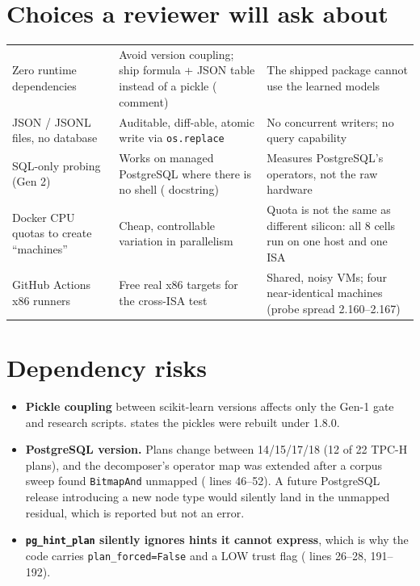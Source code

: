\section{Choices a reviewer will ask about}
\begin{center}\small
\begin{tabularx}{\textwidth}{@{}L{3.4cm}YY@{}}
\toprule {} &  & \\ \midrule
Zero runtime dependencies & Avoid version coupling; ship formula + JSON table instead of a pickle ( comment) & The shipped package cannot use the learned models\\
JSON / JSONL files, no database & Auditable, diff-able, atomic write via \texttt{os.replace} & No concurrent writers; no query capability\\
SQL-only probing (Gen 2) & Works on managed PostgreSQL where there is no shell ( docstring) & Measures PostgreSQL's operators, not the raw hardware\\
Docker CPU quotas to create ``machines'' & Cheap, controllable variation in parallelism & Quota is not the same as different silicon: all 8 cells run on one host and one ISA\\
GitHub Actions x86 runners & Free real x86 targets for the cross-ISA test & Shared, noisy VMs; four near-identical machines (probe spread 2.160--2.167)\\
\bottomrule
\end{tabularx}
\end{center}

\section{Dependency risks}
\begin{itemize}
\item \textbf{Pickle coupling} between scikit-learn versions affects only the Gen-1 gate and research
  scripts.  states the pickles were rebuilt under 1.8.0.
\item \textbf{PostgreSQL version.} Plans change between 14/15/17/18 (12 of 22 TPC-H plans), and the
  decomposer's operator map was extended after a corpus sweep found \texttt{BitmapAnd} unmapped
  ( lines 46--52). A future PostgreSQL release introducing a new node type would
  silently land in the unmapped residual, which is reported but not an error.
\item \textbf{\texttt{pg\_hint\_plan} silently ignores hints it cannot express}, which is why the code
  carries \texttt{plan\_forced=False} and a LOW trust flag ( lines 26--28, 191--192).
\end{itemize}
